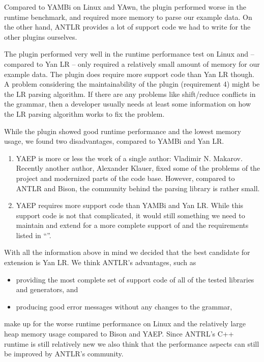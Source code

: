 \begin{description}[style=multiline, leftmargin=2cm, font=\bfseries]
  \item[Yan LR] Compared to YAMBi on Linux and YAwn, the plugin performed worse in the runtime benchmark, and required more memory to parse our example data. On the other hand, ANTLR provides a lot of support code we had to write for the other plugins ourselves.

  \item[YAMBi] The plugin performed very well in the runtime performance test on Linux and – compared to Yan LR – only required a relatively small amount of memory for our example data. The plugin does require more support code than Yan LR though. A problem considering the maintainability of the plugin (requirement 4) might be the LR parsing algorithm. If there are any problems like shift/reduce conflicts in the grammar, then a developer usually needs at least some information on how the LR parsing algorithm works to fix the problem.

  \item[YAwn] While the plugin showed good runtime performance and the lowest memory usage, we found two disadvantages, compared to YAMBi and Yan LR.

  \begin{enumerate}
    \item YAEP is more or less the work of a single author: Vladimir N. Makarov. Recently another author, Alexander Klauer, fixed some of the problems of the project and modernized parts of the code base. However, compared to ANTLR and Bison, the community behind the parsing library is rather small.

    \item YAEP requires more support code than YAMBi and Yan LR. While this support code is not that complicated, it would still something we need to maintain and extend for a more complete support of  and the requirements listed in “”.
  \end{enumerate}

\end{description}

With all the information above in mind we decided that the best candidate for extension is Yan LR. We think ANTLR’s advantages, such as

\begin{itemize}
  \item providing the most complete set of support code of all of the tested libraries and generators, and
  \item producing good error messages without any changes to the grammar,
\end{itemize}

make up for the worse runtime performance on Linux and the relatively large heap memory usage compared to Bison and YAEP. Since ANTRL’s C++ runtime is still relatively new we also think that the performance aspects can still be improved by ANTLR’s community.
